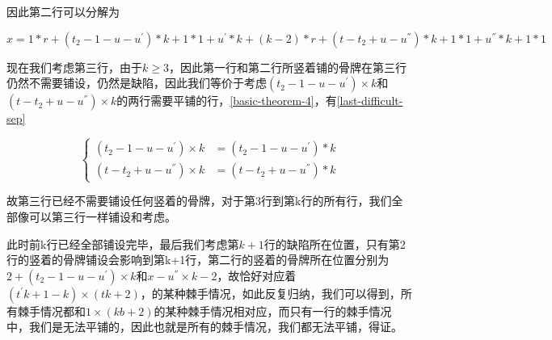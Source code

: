 因此第二行可以分解为

$x =  1 * r +  (t_2- 1 - u - u^{'}) * k + 1 * 1 +  u^{'} * k  + (k - 2) * r + (t - t_2 + u - u^{''}) * k + 1 * 1 +  u^{''} * k + 1 * 1$

现在我们考虑第三行，由于$k \ge 3$，因此第一行和第二行所竖着铺的骨牌在第三行仍然不需要铺设，仍然是缺陷，因此我们等价于考虑$(t_2- 1 - u - u^{'}) \times k$和$(t - t_2 + u - u^{''}) \times k$的两行需要平铺的行，\ref*{basic-theorem-4}，有\ref*{last-difficult-sep}

$$
    \left\{
    \begin{aligned}
        (t_2- 1 - u - u^{'}) \times k   & = (t_2- 1 - u - u^{'}) * k   \\
        (t - t_2 + u - u^{''}) \times k & = (t - t_2 + u - u^{''}) * k
        \label{last-difficult-sep}
    \end{aligned}
    \right.
$$

故第三行已经不需要铺设任何竖着的骨牌，对于第3行到第k行的所有行，我们全部像可以第三行一样铺设和考虑。

此时前k行已经全部铺设完毕，最后我们考虑第$k + 1$行的缺陷所在位置，只有第2行的竖着的骨牌铺设会影响到第k+1行，第二行的竖着的骨牌所在位置分别为$2 + (t_2- 1 - u - u^{'}) \times k$和$x - u^{''} \times k - 2$，故恰好对应着$(t^{'}k + 1 - k) \times (tk + 2)$，的某种棘手情况，如此反复归纳，我们可以得到，所有棘手情况都和$1 \times (kb + 2)$的某种棘手情况相对应，而只有一行的棘手情况中，我们是无法平铺的，因此也就是所有的棘手情况，我们都无法平铺，得证。\cite{liu2011sift}

\clearpage